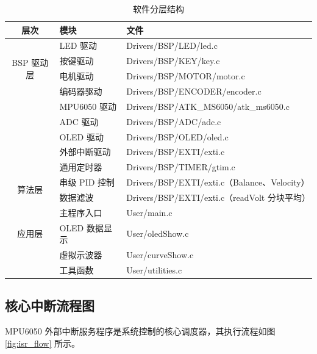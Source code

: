\documentclass[12pt,a4paper,UTF8]{ctexrep}
\begin{document}
\begin{table}[H]
  \centering
  \caption{软件分层结构}
  \label{tbl:sw_layer}
  \small
  \begin{tabular}{cp{5.5cm}p{6.5cm}}
    \toprule
    \textbf{层次} & \textbf{模块} & \textbf{文件} \\
    \midrule
    \multirow{4}{*}{BSP 驱动层}
      & LED 驱动      & Drivers/BSP/LED/led.c \\
      & 按键驱动      & Drivers/BSP/KEY/key.c \\
      & 电机驱动      & Drivers/BSP/MOTOR/motor.c \\
      & 编码器驱动    & Drivers/BSP/ENCODER/encoder.c \\
      & MPU6050 驱动  & Drivers/BSP/ATK\_MS6050/atk\_ms6050.c \\
      & ADC 驱动      & Drivers/BSP/ADC/adc.c \\
      & OLED 驱动     & Drivers/BSP/OLED/oled.c \\
      & 外部中断驱动  & Drivers/BSP/EXTI/exti.c \\
      & 通用定时器    & Drivers/BSP/TIMER/gtim.c \\
    \hline
    \multirow{2}{*}{算法层}
      & 串级 PID 控制  & Drivers/BSP/EXTI/exti.c（Balance、Velocity） \\
      & 数据滤波       & Drivers/BSP/EXTI/exti.c（readVolt 分块平均） \\
    \hline
    \multirow{3}{*}{应用层}
      & 主程序入口    & User/main.c \\
      & OLED 数据显示 & User/oledShow.c \\
      & 虚拟示波器    & User/curveShow.c \\
      & 工具函数      & User/utilities.c \\
    \bottomrule
  \end{tabular}
\end{table}

\subsection{核心中断流程图}

MPU6050 外部中断服务程序是系统控制的核心调度器，其执行流程如图 \ref{fig:isr_flow} 所示。
\end{document}
